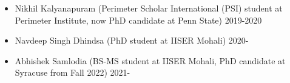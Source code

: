 \begin{itemize}
\vspace{1mm} 
  \item  Nikhil Kalyanapuram (Perimeter Scholar International (PSI) student at Perimeter Institute, now PhD candidate at Penn State) \hfill  2019-2020 
  \item  Navdeep Singh Dhindsa (PhD student at IISER Mohali) \hfill 2020- 
  \item  Abhishek Samlodia (BS-MS student at IISER Mohali, PhD candidate at Syracuse from Fall 2022) \hfill 2021- 
  \end{itemize}
